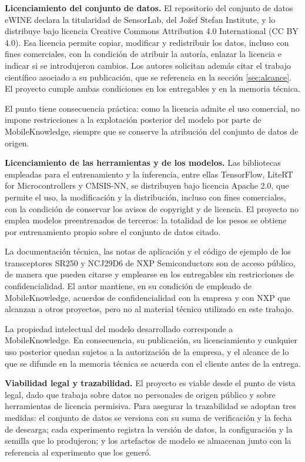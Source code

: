 \documentclass[
11pt, %
]{charter}
\begin{document}
\textbf{Licenciamiento del conjunto de datos.} El repositorio del conjunto de datos eWINE declara la titularidad de SensorLab, del Jožef Stefan Institute, y lo distribuye bajo licencia Creative Commons Attribution 4.0 International (CC BY 4.0). Esa licencia permite copiar, modificar y redistribuir los datos, incluso con fines comerciales, con la condición de atribuir la autoría, enlazar la licencia e indicar si se introdujeron cambios. Los autores solicitan además citar el trabajo científico asociado a su publicación, que se referencia en la sección \ref{sec:alcance}. El proyecto cumple ambas condiciones en los entregables y en la memoria técnica.

El punto tiene consecuencia práctica: como la licencia admite el uso comercial, no impone restricciones a la explotación posterior del modelo por parte de MobileKnowledge, siempre que se conserve la atribución del conjunto de datos de origen.

\textbf{Licenciamiento de las herramientas y de los modelos.} Las bibliotecas empleadas para el entrenamiento y la inferencia, entre ellas TensorFlow, LiteRT for Microcontrollers y CMSIS-NN, se distribuyen bajo licencia Apache 2.0, que permite el uso, la modificación y la distribución, incluso con fines comerciales, con la condición de conservar los avisos de copyright y de licencia. El proyecto no emplea modelos preentrenados de terceros: la totalidad de los pesos se obtiene por entrenamiento propio sobre el conjunto de datos citado.

La documentación técnica, las notas de aplicación y el código de ejemplo de los transceptores SR250 y NCJ29D6 de NXP Semiconductors son de acceso público, de manera que pueden citarse y emplearse en los entregables sin restricciones de confidencialidad. El autor mantiene, en su condición de empleado de MobileKnowledge, acuerdos de confidencialidad con la empresa y con NXP que alcanzan a otros proyectos, pero no al material técnico utilizado en este trabajo.

La propiedad intelectual del modelo desarrollado corresponde a MobileKnowledge. En consecuencia, su publicación, su licenciamiento y cualquier uso posterior quedan sujetos a la autorización de la empresa, y el alcance de lo que se difunde en la memoria técnica se acuerda con el cliente antes de la entrega.

\textbf{Viabilidad legal y trazabilidad.} El proyecto es viable desde el punto de vista legal, dado que trabaja sobre datos no personales de origen público y sobre herramientas de licencia permisiva. Para asegurar la trazabilidad se adoptan tres medidas: el conjunto de datos se versiona con su suma de verificación y la fecha de descarga; cada experimento registra la versión de datos, la configuración y la semilla que lo produjeron; y los artefactos de modelo se almacenan junto con la referencia al experimento que los generó.
\end{document}
